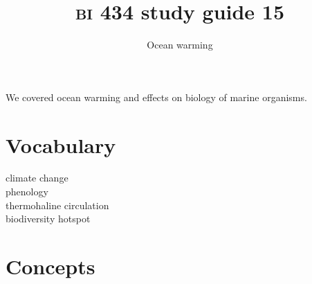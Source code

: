 \documentclass[letterpaper]{tufte-handout}
\title{{\scshape bi} 434 study guide 15}
\author{Ocean warming}
\date{} %
\begin{document}
\maketitle	%


We covered ocean warming and effects on biology of marine organisms.

\section*{Vocabulary}
\begin{multicols}{2}
climate change \\
phenology \\
thermohaline circulation \\
biodiversity hotspot
\end{multicols}
\section*{Concepts}
\end{document}

